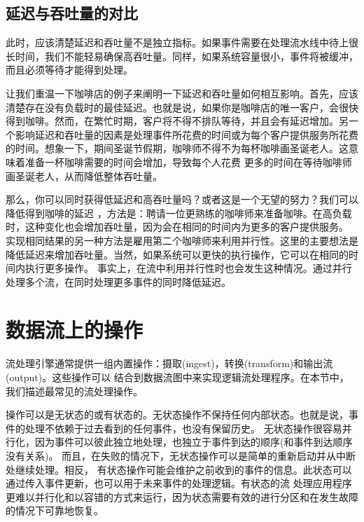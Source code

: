 \documentclass[cn,11pt,chinese]{elegantbook}
\begin{document}
\hypertarget{ux5ef6ux8fdfux4e0eux541eux5410ux91cfux7684ux5bf9ux6bd4}{%
\subsection{延迟与吞吐量的对比}\label{ux5ef6ux8fdfux4e0eux541eux5410ux91cfux7684ux5bf9ux6bd4}}

此时，应该清楚延迟和吞吐量不是独立指标。如果事件需要在处理流水线中待上很长时间，我们不能轻易确保高吞吐量。同样，如果系统容量很小，事件将被缓冲，而且必须等待才能得到处理。

让我们重温一下咖啡店的例子来阐明一下延迟和吞吐量如何相互影响。首先，应该清楚存在没有负载时的最佳延迟。也就是说，如果你是咖啡店的唯一客户，会很快得到咖啡。然而，在繁忙时期，客户将不得不排队等待，并且会有延迟增加。另一个影响延迟和吞吐量的因素是处理事件所花费的时间或为每个客户提供服务所花费的时间。想象一下，期间圣诞节假期，咖啡师不得不为每杯咖啡画圣诞老人。这意味着准备一杯咖啡需要的时间会增加，导致每个人花费
更多的时间在等待咖啡师画圣诞老人，从而降低整体吞吐量。

那么，你可以同时获得低延迟和高吞吐量吗？或者这是一个无望的努力？我们可以降低得到咖啡的延迟
，方法是：聘请一位更熟练的咖啡师来准备咖啡。在高负载时，这种变化也会增加吞吐量，因为会在相同的时间内为更多的客户提供服务。
实现相同结果的另一种方法是雇用第二个咖啡师来利用并行性。这里的主要想法是降低延迟来增加吞吐量。当然，如果系统可以更快的执行操作，它可以在相同的时间内执行更多操作。
事实上，在流中利用并行性时也会发生这种情况。通过并行处理多个流，在同时处理更多事件的同时降低延迟。

\hypertarget{ux6570ux636eux6d41ux4e0aux7684ux64cdux4f5c}{%
\section{数据流上的操作}\label{ux6570ux636eux6d41ux4e0aux7684ux64cdux4f5c}}

流处理引擎通常提供一组内置操作：摄取(ingest)，转换(transform)和输出流(output)。这些操作可以
结合到数据流图中来实现逻辑流处理程序。在本节中，我们描述最常见的流处理操作。

操作可以是无状态的或有状态的。无状态操作不保持任何内部状态。也就是说，事件的处理不依赖于过去看到的任何事件，也没有保留历史。
无状态操作很容易并行化，因为事件可以彼此独立地处理，也独立于事件到达的顺序(和事件到达顺序没有关系)。
而且，在失败的情况下，无状态操作可以是简单的重新启动并从中断处继续处理。相反，
有状态操作可能会维护之前收到的事件的信息。此状态可以通过传入事件更新，也可以用于未来事件的处理逻辑。有状态的流
处理应用程序更难以并行化和以容错的方式来运行，因为状态需要有效的进行分区和在发生故障的情况下可靠地恢复。
\end{document}
